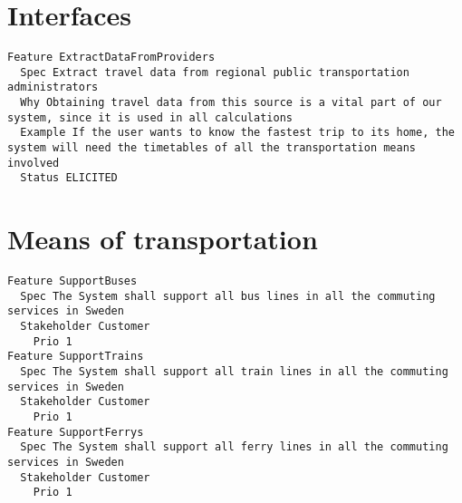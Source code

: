        
       \section{Interfaces}


\begin{lstlisting}
Feature ExtractDataFromProviders
  Spec Extract travel data from regional public transportation administrators
  Why Obtaining travel data from this source is a vital part of our system, since it is used in all calculations
  Example If the user wants to know the fastest trip to its home, the system will need the timetables of all the transportation means involved
  Status ELICITED

\end{lstlisting}
    
        
       \section{Means of transportation}


\begin{lstlisting}
Feature SupportBuses
  Spec The System shall support all bus lines in all the commuting services in Sweden
  Stakeholder Customer
    Prio 1
Feature SupportTrains
  Spec The System shall support all train lines in all the commuting services in Sweden
  Stakeholder Customer
    Prio 1
Feature SupportFerrys
  Spec The System shall support all ferry lines in all the commuting services in Sweden
  Stakeholder Customer
    Prio 1

\end{lstlisting}